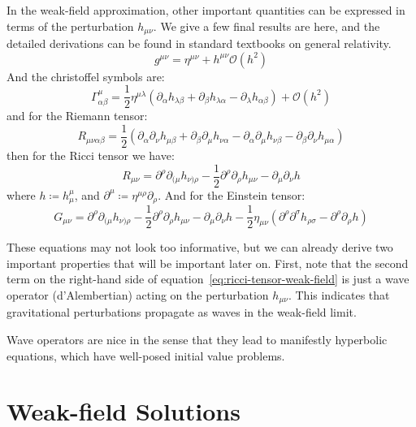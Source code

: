 In the weak-field approximation, other important quantities can be expressed in terms of the perturbation $h_{\mu\nu}$.
We give a few final results are here, and the detailed derivations can be found in standard textbooks on general relativity.
\begin{equation}
    g^{\mu\nu} = \eta^{\mu\nu} + h^{\mu\nu}\mathcal{O}(h^2) \label{eq:inverse-metric-weak-field}
\end{equation}
And the christoffel symbols are:
\begin{equation}
    \Gamma^{\mu}_{\alpha\beta} = \frac12 \eta^{\mu\lambda} \left(
                                                               \partial_{\alpha} h_{\lambda\beta} + \partial_{\beta}h_{\lambda\alpha} - \partial_{\lambda}h_{\alpha\beta}
    \right) + \mathcal{O}(h^2)\label{eq:christoffel-symbols-weak-field}
\end{equation}
and for the Riemann tensor:
\begin{equation}
    R_{\mu\nu\alpha\beta} = \frac12 \left(
                                        \partial_{\alpha}\partial_{\nu} h_{\mu\beta} + \partial_{\beta}\partial_{\mu} h_{\nu\alpha} - \partial_{\alpha}\partial_{\mu}h_{\nu\beta} - \partial_{\beta}\partial_{\nu} h_{\mu\alpha}
    \right)\label{eq:riemman-tensor-weak-field}
\end{equation}
then for the Ricci tensor we have:
\begin{equation}
    R_{\mu\nu} = \partial^{\rho}\partial_{(\mu}h_{\nu)\rho} -\frac12 \partial^{\rho}\partial_{\rho}h_{\mu\nu} - \partial_{\mu}\partial_{\nu}h\label{eq:ricci-tensor-weak-field}
\end{equation}
where $h \coloneqq h^\mu_\mu$, and $\partial^\mu \coloneq \eta^{\mu\rho}\partial_\rho$.
And for the Einstein tensor:
\begin{equation}
    G_{\mu\nu} = \partial^{\rho}\partial_{(\mu} h_{\nu)\rho} -\frac12 \partial^{\rho}\partial_{\rho}h_{\mu\nu} - \partial_{\mu}\partial_{\nu}h - \frac12 \eta_{\mu\nu}\left(\partial^{\rho}\partial^{\sigma}h_{\rho\sigma} - \partial^{\rho}\partial_{\rho}h\right)\label{eq:einstein-tensor-weak-field}
\end{equation}

These equations may not look too informative, but we can already derive two important properties that will be important later on.
First, note that the second term on the right-hand side of equation~\ref{eq:ricci-tensor-weak-field} is just a wave operator (d'Alembertian) acting on the perturbation $h_{\mu\nu}$.
This indicates that gravitational perturbations propagate as waves in the weak-field limit.

Wave operators are nice in the sense that they lead to manifestly hyperbolic equations, which have well-posed initial value problems.


\section{Weak-field Solutions}\label{sec:weak-field-solutions}

